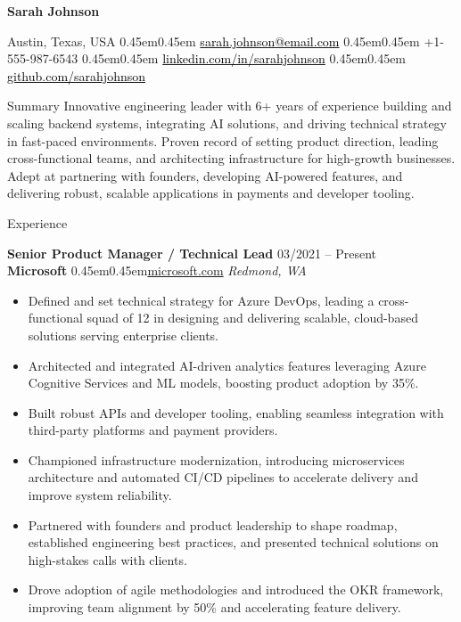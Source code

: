 \documentclass[10pt, letterpaper]{article}
\makeatletter
\renewcommand{\section}{%
  \@startsection{section}{1}{\z@}{10pt}{6pt}{%
    \Large\bfseries\color{black}%
  }%
}
\newcommand{\bull}{\kern0.45em\textbullet\kern0.45em}
\newcommand{\role}[1]{\textbf{#1}}
\newcommand{\org}[1]{\textbf{#1}}
\newcommand{\place}[1]{\textit{#1}}
\newcommand{\blackLink}[2]{\href{#1}{\textcolor{black}{#2}}}
\renewcommand{\maketitle}{
  \begin{center}
    {\huge\bfseries Sarah Johnson}\par\vspace{6pt}
    {\color{Primary}
      Austin, Texas, USA \bull
      \blackLink{mailto:sarah.johnson@email.com}{sarah.johnson@email.com} \bull
      +1-555-987-6543 \bull
      \blackLink{https://linkedin.com/in/sarahjohnson}{linkedin.com/in/sarahjohnson} \bull
      \blackLink{https://github.com/sarahjohnson}{github.com/sarahjohnson}
    }
  \end{center}
  \vspace{-8pt}
}
\makeatother
\begin{document}
\maketitle
\vspace{15pt}

\section{Summary}
Innovative engineering leader with 6+ years of experience building and scaling backend systems, integrating AI solutions, and driving technical strategy in fast-paced environments. Proven record of setting product direction, leading cross-functional teams, and architecting infrastructure for high-growth businesses. Adept at partnering with founders, developing AI-powered features, and delivering robust, scalable applications in payments and developer tooling.

\section{Experience}

\role{Senior Product Manager / Technical Lead} \hfill 03/2021 -- Present \\
\org{Microsoft} \bull \href{https://microsoft.com}{microsoft.com} \hfill \place{Redmond, WA}
\begin{itemize}
  \item Defined and set technical strategy for Azure DevOps, leading a cross-functional squad of 12 in designing and delivering scalable, cloud-based solutions serving enterprise clients.
  \item Architected and integrated AI-driven analytics features leveraging Azure Cognitive Services and ML models, boosting product adoption by 35\%.
  \item Built robust APIs and developer tooling, enabling seamless integration with third-party platforms and payment providers.
  \item Championed infrastructure modernization, introducing microservices architecture and automated CI/CD pipelines to accelerate delivery and improve system reliability.
  \item Partnered with founders and product leadership to shape roadmap, established engineering best practices, and presented technical solutions on high-stakes calls with clients.
  \item Drove adoption of agile methodologies and introduced the OKR framework, improving team alignment by 50\% and accelerating feature delivery.
\end{itemize}
\vspace{12pt}
\end{document}
